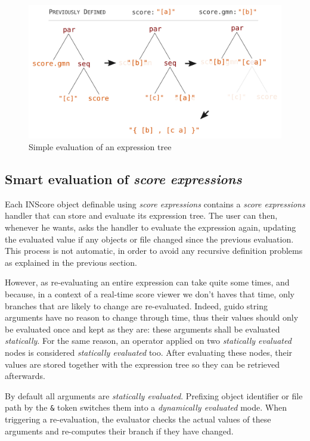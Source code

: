 \documentclass{article}
\newcommand{\OSC}[1]{\texttt{#1}}
\newcommand{\sExpr}{\emph{score expressions} }
\begin{document}
\begin{figure}[th]
\centering
\includegraphics[width=1\columnwidth]{imgs/classicEval}
\caption{Simple evaluation of an expression tree
\label{fig:classicEval}}
\end{figure}




\subsection{Smart evaluation of \sExpr}

Each INScore object definable using \sExpr contains a \sExpr handler that can store and evaluate  its expression tree. The user can then, whenever he wants, asks the handler to evaluate the expression again, updating the evaluated value if any objects or file changed since the previous evaluation. This process is not automatic, in order to avoid any recursive definition problems as explained in the previous section.

However, as re-evaluating an entire expression can take quite some times, and because, in a context of a real-time score viewer we don't haves that time, only branches that are likely to change are re-evaluated. Indeed, guido string arguments have no reason to change through time, thus their values should only be evaluated once and kept as they are: these arguments shall be evaluated \emph{statically}. For the same reason, an operator applied on two \emph{statically evaluated} nodes is considered \emph{statically evaluated} too. After evaluating these nodes, their values are stored together with the expression tree so they can be retrieved afterwards.

By default all arguments are \emph{statically evaluated}. Prefixing object identifier or file path by the \OSC{\&} token switches them into a \emph{dynamically evaluated} mode. When triggering a re-evaluation, the evaluator checks the actual values of these arguments and re-computes their branch if they have changed.
\end{document}
